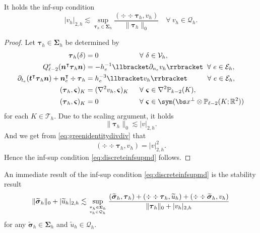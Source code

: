 \begin{lemma}
It holds the inf-sup condition
\begin{equation}\label{eq:discreteinfsupmd}
|v_h|_{2,h}\lesssim \sup_{\boldsymbol{\tau}_h\in\boldsymbol\Sigma_h}\frac{(\div\div\boldsymbol{\tau}_h, v_h)}{\|\boldsymbol{\tau}_h\|_0}\quad\forall~v_h\in\mathcal Q_h.
\end{equation}
\end{lemma}
\begin{proof}
Let $\boldsymbol{\tau}_h\in\boldsymbol\Sigma_h$ be determined by
\begin{align*}
\boldsymbol \tau_h (\delta)&=0  \qquad\qquad\quad\;\;\;\forall~\delta\in \mathcal V_h, \\
Q_{\ell-2}^e(\boldsymbol  n^{\intercal}\boldsymbol \tau_h\boldsymbol n)&=-h_e^{-1}\llbracket \partial_{n_e}v_h\rrbracket  \;\;\forall~ e\in\mathcal E_h, \\
\partial_{t_e}(\boldsymbol  t^{\intercal}\boldsymbol \tau_h\boldsymbol  n)+\boldsymbol n_e^{\intercal}\div\boldsymbol \tau_h&=h_e^{-3}\llbracket v_h\rrbracket  \qquad\;\;\;\forall~ e\in\mathcal E_h, \\
(\boldsymbol \tau_h, \boldsymbol \varsigma)_K&=(\nabla^2v_h, \boldsymbol \varsigma)_K  \quad\;\;\forall~\boldsymbol \varsigma\in\nabla^2\mathbb P_{k-2}(K), \\
(\boldsymbol \tau_h, \boldsymbol \varsigma)_K&=0  \qquad\qquad\quad\;\;\;\forall~\boldsymbol \varsigma\in\sym (\bs x^{\perp}\otimes \mathbb P_{\ell-2}(K;\mathbb R^2))
\end{align*}
for each $K\in\mathcal T_h$.
Due to the scaling argument, it holds
\[
\|\boldsymbol \tau_h\|_0\lesssim |v|_{2,h}.
\]
And we get from \eqref{eq:greenidentitydivdiv} that
\[
(\div\div\boldsymbol \tau_h, v_h)=|v|_{2,h}^2.
\]
Hence the inf-sup condition \eqref{eq:discreteinfsupmd} follows.
\end{proof}


An immediate result of the inf-sup condition \eqref{eq:discreteinfsupmd} is the stability result
\begin{equation}\label{eq:discretestabilitymd}
\|\widetilde{\boldsymbol{\sigma}}_h\|_{0}+|\widetilde{u}_h|_{2,h}\lesssim \sup_{\boldsymbol{\tau}_h\in\boldsymbol\Sigma_h\atop v_h\in\mathcal Q_h}\frac{(\widetilde{\boldsymbol{\sigma}}_h, \boldsymbol{\tau}_h)+(\div\div\boldsymbol{\tau}_h, \widetilde{u}_h)+(\div\div\widetilde{\boldsymbol{\sigma}}_h, v_h)}{\|\boldsymbol{\tau}_h\|_{0} + |v_h|_{2,h}}
\end{equation}
for any $\widetilde{\boldsymbol{\sigma}}_h\in\boldsymbol\Sigma_h$ and $\widetilde{u}_h\in\mathcal Q_h$.

